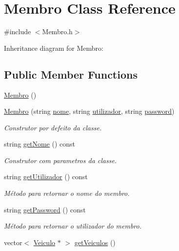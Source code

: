 \hypertarget{class_membro}{\section{Membro Class Reference}
\label{class_membro}
}


{\ttfamily \#include $<$Membro.\+h$>$}



Inheritance diagram for Membro\+:
\subsection*{Public Member Functions}
\begin{DoxyCompactItemize}
\item 
\hyperlink{class_membro_a29dfd4ec647ea5cdefcd11d85deb5d1d}{Membro} ()
\item 
\hyperlink{class_membro_a2dc48d0c0febf2d3270128734bdce7d0}{Membro} (string \hyperlink{class_membro_a2598bbe34ae32a98f41468b2202a9555}{nome}, string \hyperlink{class_membro_a42cc733ff94ec8d1bbfdacc62dfbb0e7}{utilizador}, string \hyperlink{class_membro_ae2b12fc3e91efc674c07e735edf4ac21}{password})
\begin{DoxyCompactList}\small\item\em Construtor por defeito da classe. \end{DoxyCompactList}\item 
string \hyperlink{class_membro_af7cfd42d45960183ccf1002246cb0bd2}{get\+Nome} () const 
\begin{DoxyCompactList}\small\item\em Construtor com parametros da classe. \end{DoxyCompactList}\item 
string \hyperlink{class_membro_ae124b54c2b8572e531c873788263222d}{get\+Utilizador} () const 
\begin{DoxyCompactList}\small\item\em Método para retornar o nome do membro. \end{DoxyCompactList}\item 
string \hyperlink{class_membro_af9c84eb5f83b1fd64d4c542f419d6953}{get\+Password} () const 
\begin{DoxyCompactList}\small\item\em Método para retornar o utilizador do membro. \end{DoxyCompactList}\item 
vector$<$ \hyperlink{class_veiculo}{Veiculo} $\ast$ $>$ \hyperlink{class_membro_afdd3c41bfc8e859bb8762516440c8144}{get\+Veiculos} ()

\end{DoxyCompactItemize}

